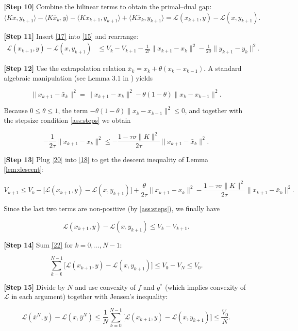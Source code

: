 \documentclass{article}
\begin{document}
\noindent\textbf{[Step 10]} Combine the bilinear terms to obtain the primal–dual gap:
\[
\langle Kx,y_{k+1}\rangle-\langle K\bar{x}_{k},y\rangle
-\langle Kx_{k+1},y_{k+1}\rangle+\langle K\bar{x}_{k},y_{k+1}\rangle
= \mathcal{L}(x_{k+1},y)-\mathcal{L}(x,y_{k+1}) .
\tag{17}
\]

\noindent\textbf{[Step 11]} Insert \eqref{17} into \eqref{15} and rearrange:
\[
\begin{aligned}
\mathcal{L}(x_{k+1},y)-\mathcal{L}(x,y_{k+1})
&\le V_{k}-V_{k+1}
   -\frac{1}{2\tau}\|x_{k+1}-x_{k}\|^{2}
   -\frac{1}{2\sigma}\|y_{k+1}-y_{k}\|^{2}.
\end{aligned}
\tag{18}
\]

\noindent\textbf{[Step 12]} Use the extrapolation relation $\bar{x}_{k}=x_{k}+\theta(x_{k}-x_{k-1})$.
A standard algebraic manipulation (see Lemma 3.1 in \cite{chambolle2011first}) yields

\[
\|x_{k+1}-\bar{x}_{k}\|^{2}
= \|x_{k+1}-x_{k}\|^{2}
   -\theta(1-\theta)\|x_{k}-x_{k-1}\|^{2}.
\tag{19}
\]

Because $0\le\theta\le1$, the term $-\theta(1-\theta)\|x_{k}-x_{k-1}\|^{2}\le0$, and together with the stepsize condition \eqref{ass:steps} we obtain

\[
-\frac{1}{2\tau}\|x_{k+1}-x_{k}\|^{2}
\le
-\frac{1-\tau\sigma\|K\|^{2}}{2\tau}\|x_{k+1}-\bar{x}_{k}\|^{2}.
\tag{20}
\]

\noindent\textbf{[Step 13]} Plug \eqref{20} into \eqref{18} to get the descent inequality of Lemma \ref{lem:descent}:

\[
V_{k+1}\le V_{k}
-\bigl[\mathcal{L}(x_{k+1},y)-\mathcal{L}(x,y_{k+1})\bigr]
+\frac{\theta}{2\tau}\|x_{k+1}-x_{k}\|^{2}
-\frac{1-\tau\sigma\|K\|^{2}}{2\tau}\|x_{k+1}-\bar{x}_{k}\|^{2}.
\tag{21}
\]

Since the last two terms are non‑positive (by \eqref{ass:steps}), we finally have

\[
\mathcal{L}(x_{k+1},y)-\mathcal{L}(x,y_{k+1})
\le V_{k}-V_{k+1}.
\tag{22}
\]

\noindent\textbf{[Step 14]} Sum \eqref{22} for $k=0,\dots,N-1$:

\[
\sum_{k=0}^{N-1}\bigl[\mathcal{L}(x_{k+1},y)-\mathcal{L}(x,y_{k+1})\bigr]
\le V_{0}-V_{N}\le V_{0}.
\tag{23}
\]

\noindent\textbf{[Step 15]} Divide by $N$ and use convexity of $f$ and $g^{*}$ (which implies convexity of $\mathcal{L}$ in each argument) together with Jensen’s inequality:

\[
\mathcal{L}(\bar{x}^{N},y)-\mathcal{L}(x,\bar{y}^{N})
\le\frac{1}{N}\sum_{k=0}^{N-1}\bigl[\mathcal{L}(x_{k+1},y)-\mathcal{L}(x,y_{k+1})\bigr]
\le\frac{V_{0}}{N}.
\tag{24}
\]
\end{document}
